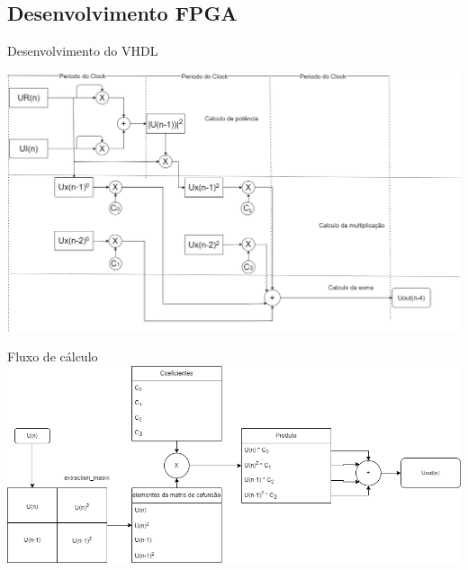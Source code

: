 \documentclass{if-beamer}
\begin{document}
\subsection{Desenvolvimento FPGA}
\begin{frame}{Desenvolvimento do VHDL}
	
		\includegraphics[scale=0.2]{diagrama_process.png}
\end{frame}
\begin{frame}{Fluxo de cálculo}
	\includegraphics[scale=0.25]{fluxo_de_calculo.png}
\end{frame}
\end{document}
